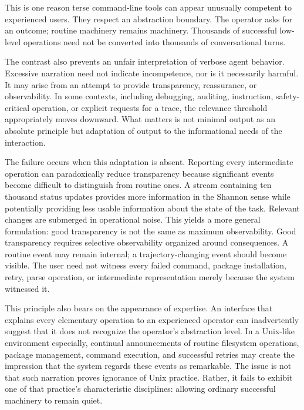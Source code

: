 This is one reason terse command-line tools can appear unusually competent to experienced users. They respect an abstraction boundary. The operator asks for an outcome; routine machinery remains machinery. Thousands of successful low-level operations need not be converted into thousands of conversational turns.

The contrast also prevents an unfair interpretation of verbose agent behavior. Excessive narration need not indicate incompetence, nor is it necessarily harmful. It may arise from an attempt to provide transparency, reassurance, or observability. In some contexts, including debugging, auditing, instruction, safety-critical operation, or explicit requests for a trace, the relevance threshold appropriately moves downward. What matters is not minimal output as an absolute principle but adaptation of output to the informational needs of the interaction.

The failure occurs when this adaptation is absent. Reporting every intermediate operation can paradoxically reduce transparency because significant events become difficult to distinguish from routine ones. A stream containing ten thousand status updates provides more information in the Shannon sense while potentially providing less usable information about the state of the task. Relevant changes are submerged in operational noise. This yields a more general formulation: good transparency is not the same as maximum observability. Good transparency requires selective observability organized around consequences. A routine event may remain internal; a trajectory-changing event should become visible. The user need not witness every failed command, package installation, retry, parse operation, or intermediate representation merely because the system witnessed it.

This principle also bears on the appearance of expertise. An interface that explains every elementary operation to an experienced operator can inadvertently suggest that it does not recognize the operator's abstraction level. In a Unix-like environment especially, continual announcements of routine filesystem operations, package management, command execution, and successful retries may create the impression that the system regards these events as remarkable. The issue is not that such narration proves ignorance of Unix practice. Rather, it fails to exhibit one of that practice's characteristic disciplines: allowing ordinary successful machinery to remain quiet.

